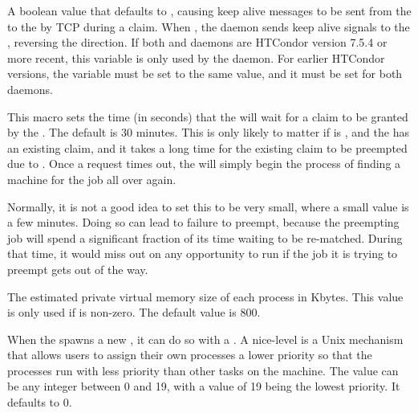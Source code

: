 \begin{description}
\label{param:StartdSendsAlives}
\item[\Macro{STARTD\_SENDS\_ALIVES}]
  A boolean value that defaults to ,
  causing keep alive messages to be sent from the  to the
   by TCP during a claim.
  When , the  daemon sends keep alive signals
  to the , reversing the direction.
  If both  and  daemons are HTCondor version 7.5.4
  or more recent, this variable is only used by the  daemon.
  For earlier HTCondor versions, the variable must be set to the same value,
  and it must be set for both daemons.

\label{param:RequestClaimTimeout}
\item[\Macro{REQUEST\_CLAIM\_TIMEOUT}]
  This macro sets the time (in
  seconds) that the  will wait for a claim to be granted by the
  .  The default is 30 minutes.  This is only likely to matter
  if  is , and the
   has an existing claim, and it takes a long time for the
  existing claim to be preempted due to .
  Once a request times out, the  will simply begin the process
  of finding a machine for the job all over again.

  Normally, it is not a good idea to set this to be very small, 
  where a small value is a few minutes.  
  Doing so can lead to failure to preempt, because the
  preempting job will spend a significant fraction of its time waiting
  to be re-matched.  During that time, it would miss out on any
  opportunity to run if the job it is trying to preempt gets out of
  the way.

\label{param:ShadowSizeEstimate}
\item[\Macro{SHADOW\_SIZE\_ESTIMATE}]
  The estimated private virtual memory size of each
   process in Kbytes.
  This value is only used if  is non-zero.
  The default value is 800.

\label{param:ShadowReniceIncrement}
\item[\Macro{SHADOW\_RENICE\_INCREMENT}]
  When the  spawns a new
  , it can do so with a .  A
  nice-level is a Unix mechanism that allows users to assign their own
  processes a lower priority so that the processes run with less
  priority than other tasks on the machine.  The value can be any
  integer between 0 and 19, with a value of 19 being the lowest
  priority.  It defaults to 0.


\end{description}
